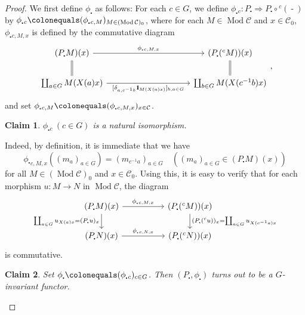 \documentclass{surv-l}
\numberwithin{equation}{chapter}
\numberwithin{figure}{chapter}
\theoremstyle{plain}
\newtheorem{clm}{Claim}
\theoremstyle{definition}
\theoremstyle{remark}
\newcommand{\id}{1\kern-.25em{\text{{\rm l}}}}
\newcommand{\Ar}[3]{\ar[from={#1}, to={#2}, #3]}
\DeclareMathOperator{\Mod}{Mod}
\DeclareMathOperator{\blank}{-}
\begin{document}
\begin{proof}
\setcounter{clm}{0}
We first define $\phi_{\centerdot}$ as follows:
For each $c \in G$, we define $\phi_{\centerdot}{}_c \colon P_{\centerdot} \Rightarrow P_{\centerdot} \circ {}^c(\blank)$
by $\phi_{\centerdot}{}_{c}\colonequals  (\phi_{\centerdot}{}_{c, M})_{M\in (\Mod {\mathcal{C}})_0}$, where
for each $M \in \Mod {\mathcal{C}}$ and $x \in {\mathcal{C}}_0$,
$\phi_{\centerdot}{}_{c, M, x}$ is defined by the commutative diagram
\[
\begin{tikzcd}[column sep=10em]
(P_{\centerdot} M)(x) & (P_{\centerdot} ({}^{c}M))(x)\\
\coprod_{a \in G}M(X(a)x) &\coprod_{b\in G}M(X(c^{-1} b)x)
\Ar{1-1}{1-2}{"{\phi_{\centerdot}{}_{c, M, x}}"}
\Ar{2-1}{2-2}{"{[\delta_{a,c^{-1} b}\id_{M(X(a)x)}]_{b,a \in G}}" '}
\Ar{1-1}{2-1}{equal}
\Ar{1-2}{2-2}{equal}
\end{tikzcd},
\]
and set $\phi_{\centerdot}{}_{c, M}\colonequals  (\phi_{\centerdot}{}_{c, M, x})_{x\in {\mathcal{C}}}$.

\begin{clm}
$\phi_{\centerdot}{}_{c}\ (c\in G)$ is a natural isomorphism.
\end{clm}
Indeed, by definition, it is immediate that we have
\begin{equation}\label{eq:ph-down}
{\phi_{\centerdot}}_{c,M,x}((m_a)_{a\in G}) = (m_{c^{-1} a})_{a\in G} \quad ((m_a)_{a\in G} \in (P_{\centerdot} M)(x))
\end{equation}
for all $M \in (\Mod{\mathcal{C}})_0$ and $x \in {\mathcal{C}}_0$.
Using this, it is easy to verify that for each morphism $u \colon M  \to N$
in $\Mod{\mathcal{C}}$, the diagram
\[
\begin{tikzcd}[column sep=5em]
(P_{\centerdot} M)(x) & (P_{\centerdot} ({}^{c}M))(x)\\
(P_{\centerdot} N)(x) & (P_{\centerdot} ({}^{c}N))(x)
\Ar{1-1}{1-2}{"{\phi_{\centerdot}{}_{c, M, x}}"}
\Ar{2-1}{2-2}{"{\phi_{\centerdot}{}_{c, N, x}}"}
\Ar{1-1}{2-1}{"\coprod_{a\in G} u_{X(a)x} = (P_{\centerdot} u)_x" '}
\Ar{1-2}{2-2}{"(P_{\centerdot} ({}^c u))_x = \coprod_{a\in G}u_{X(c^{-1} a)x}"}
\end{tikzcd}
\]
is commutative.

\begin{clm}
Set $\phi_{\centerdot}\colonequals (\phi_{\centerdot}{}_{c})_{c\in G}$.
Then $(P_{\centerdot}, \phi_{\centerdot})$ turns out to be a $G$-invariant functor.
\end{clm}


\end{proof}
\end{document}
